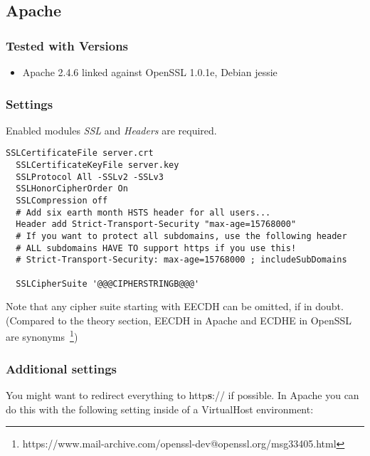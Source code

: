 
\subsection{Apache}

\subsubsection{Tested with Versions} 
\begin{itemize}
\item Apache 2.4.6 linked against OpenSSL 1.0.1e, Debian jessie
\end{itemize}


\subsubsection{Settings} 

Enabled modules \emph{SSL} and \emph{Headers} are required.

\begin{lstlisting}[breaklines]
  SSLCertificateFile server.crt
  SSLCertificateKeyFile server.key
  SSLProtocol All -SSLv2 -SSLv3 
  SSLHonorCipherOrder On
  SSLCompression off
  # Add six earth month HSTS header for all users...
  Header add Strict-Transport-Security "max-age=15768000"
  # If you want to protect all subdomains, use the following header
  # ALL subdomains HAVE TO support https if you use this!
  # Strict-Transport-Security: max-age=15768000 ; includeSubDomains

  SSLCipherSuite '@@@CIPHERSTRINGB@@@'

\end{lstlisting}

Note that any cipher suite starting with EECDH can be omitted, if in doubt.
(Compared to the theory section, EECDH in Apache and ECDHE in OpenSSL are
synonyms~\footnote{https://www.mail-archive.com/openssl-dev@openssl.org/msg33405.html})

\subsubsection{Additional settings}

You might want to redirect everything to http\textbf{s}:// if possible. In Apache you can do this with the following setting inside of a VirtualHost environment:

